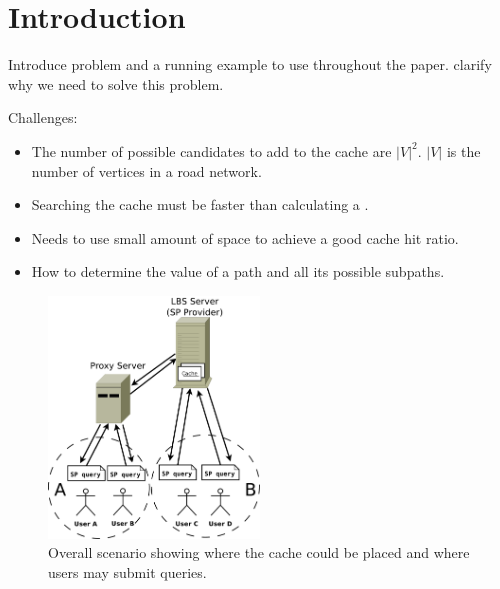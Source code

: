 \section{Introduction} \label{sec:intro}

Introduce problem and a running example to use throughout the paper. 
clarify why we need to solve this problem.

Challenges:
\begin{itemize}
\item The number of possible \spath candidates to add to the cache are $|V|^2$. $|V|$ is the number of vertices in a road network.
\item Searching the cache must be faster than calculating a \spathns.
\item Needs to use small amount of space to achieve a good cache hit ratio.
\item How to determine the value of a path and all its possible subpaths.
\end{itemize}


\begin{figure}
  \center
        \includegraphics[width=0.5\textwidth]{figures/scenario}
        \caption{Overall scenario showing where the cache could be placed and where users may submit \spath queries.}
  \label{fig:routequery}
\end{figure}